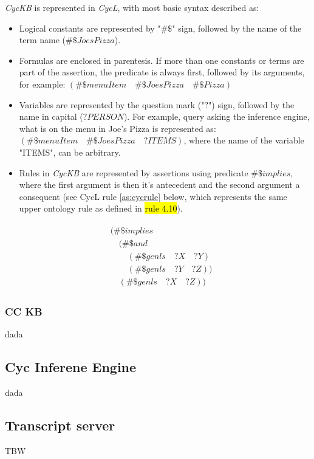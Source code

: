 \emph{CycKB} is represented in \emph{CycL}, with most basic syntax described as:
\begin{itemize}
\item Logical constants are represented by "$\#\$$" sign, followed by the name 
of the term name ($\#\$JoesPizza$).
\item Formulas are enclosed in parentesis. If more than one constants or terms
are part of the assertion, the predicate is always first, followed by its
arguments, for example: $(\#\$menuItem\quad\#\$JoesPizza\quad\#\$Pizza)$
\item Variables are represented by the question mark ("$?$") sign, followed
by the name in capital ($?PERSON$). For example, query asking the inference
engine, what is on the menu in Joe's Pizza is represented as: 
$(\#\$menuItem\quad\#\$JoesPizza\quad?ITEMS)$, where the name of the variable
"ITEMS", can be arbitrary.
\item Rules in \emph{CycKB} are represented by assertions using predicate 
$\#\$implies$, where the first argument is then it's antecedent and the second
argument a consequent (see CycL rule \ref{as:cycrule} below, which represents
the same upper ontology rule as defined in \hl{rule 4.10}).
\end{itemize}

\begin{equation}\label{as:cycrule}
\begin{gathered}
\begin{aligned}
&(\#\$implies\\
	&\quad(\#\$and\\
		&\qquad(\#\$genls\quad?X\quad?Y)\\
		&\qquad(\#\$genls\quad?Y\quad?Z))\\
	&\quad(\#\$genls\quad?X\quad?Z))
\end{aligned}
\end{gathered}
\end{equation}
\subsubsection{CC KB}
\label{section:cckb}
dada

\subsection{Cyc Inferene Engine}
\label{section:cycinference}
dada

\subsection{Transcript server}
\label{section:transcriptserver}
TBW

